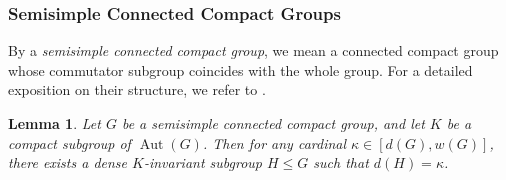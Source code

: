 \documentclass[12pt]{amsart}
\newtheorem{lemma}[theorem]{Lemma}
\theoremstyle{definition}
\numberwithin{equation}{section}
\theoremstyle{remark}
\def\Aut{\operatorname{Aut}}
\begin{document}
\subsubsection{Semisimple Connected Compact Groups}

By a \emph{semisimple connected compact group}, we mean a connected compact group whose commutator subgroup coincides with the whole group. For a detailed exposition on their structure, we refer to \cite[Ch.~9]{HM}.

\begin{lemma}\label{semisim}
Let $G$ be a semisimple connected compact group, and let $K$ be a compact subgroup of $\Aut(G)$. Then for any cardinal $\kappa \in [d(G), w(G)]$, there exists a dense $K$-invariant subgroup $H \leq G$ such that $d(H) = \kappa$.
\end{lemma}
\end{document}
